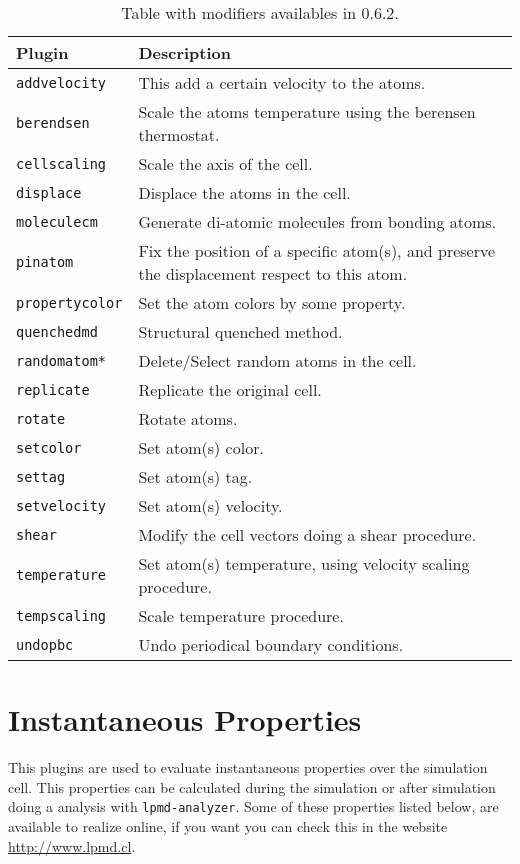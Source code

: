 \begin{table}[h!]\centering
 \begin{tabular}{|l|p{13cm}|}\hline
 Plugin  & Description \\
 \hline\hline
 \texttt{addvelocity} & This add a certain velocity to the atoms.\\
 \hline
 \texttt{berendsen} & Scale the atoms temperature using the berensen
 thermostat.\\
 \hline
 \texttt{cellscaling} & Scale the axis of the cell.\\
 \hline
 \texttt{displace} & Displace the atoms in the cell.\\
 \hline
 \texttt{moleculecm} & Generate di-atomic molecules from bonding atoms.\\
 \hline
 \texttt{pinatom} & Fix the position of a specific atom(s), and preserve the
 displacement respect to this atom.\\
 \hline
 \texttt{propertycolor} & Set the atom colors by some property.\\
 \hline
 \texttt{quenchedmd} & Structural quenched method.\\
 \hline
 \texttt{randomatom*} & Delete/Select random atoms in the cell.\\
 \hline
 \texttt{replicate} & Replicate the original cell.\\
 \hline
 \texttt{rotate} & Rotate atoms.\\
 \hline
 \texttt{setcolor} & Set atom(s) color.\\
 \hline
 \texttt{settag} & Set atom(s) tag.\\
 \hline
 \texttt{setvelocity} & Set atom(s) velocity.\\
 \hline
 \texttt{shear} & Modify the cell vectors doing a shear procedure.\\
 \hline
 \texttt{temperature} & Set atom(s) temperature, using velocity scaling
 procedure.\\
 \hline
 \texttt{tempscaling} & Scale temperature procedure.\\
 \hline
 \texttt{undopbc} & Undo periodical boundary conditions.\\
 \hline
 \end{tabular}
\label{tab:modmodify}
\caption{Table with modifiers availables in {\lpmd} 0.6.2.}
\end{table}

\section{Instantaneous Properties}
This plugins are used to evaluate instantaneous properties over the simulation
cell. This properties can be calculated during the simulation or after
simulation doing a analysis with \texttt{lpmd-analyzer}. Some of these
properties listed below, are available to realize online, if you want you can
check this in the website \url{http://www.lpmd.cl}.

